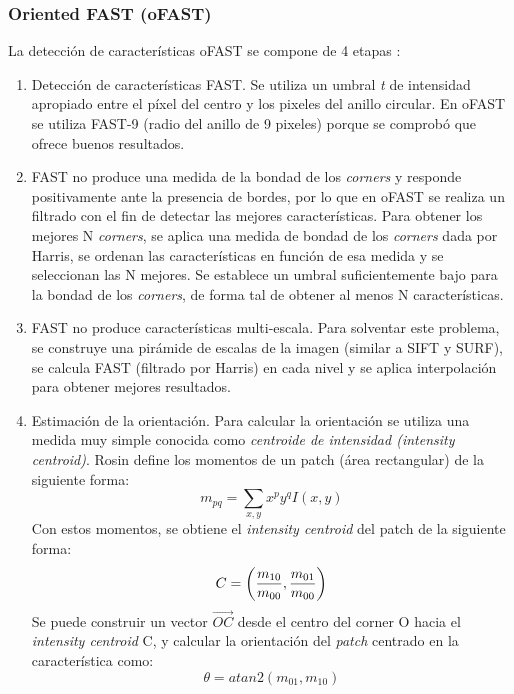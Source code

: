 \subsubsection{Oriented FAST (oFAST)}

La detección de características oFAST se compone de 4 etapas :
\begin{enumerate}

\item Detección de características FAST. Se utiliza un umbral \textsl{t} de intensidad apropiado entre el píxel del centro y los pixeles del anillo circular. En oFAST se utiliza FAST-9 (radio del anillo de 9 pixeles) porque se comprobó que ofrece buenos resultados.

\item FAST no produce una medida de la bondad de los \textit{corners} y responde positivamente ante la presencia de bordes, por lo que en oFAST se realiza un filtrado con el fin de detectar las mejores características. Para obtener los mejores N \textit{corners}, se aplica una medida de bondad de los \textit{corners} dada por Harris\cite{Harris88alvey}, se ordenan las características en función de esa medida y se seleccionan las N mejores. Se establece un umbral suficientemente bajo para la bondad de los \textit{corners}, de forma tal de obtener al menos N características.

\item FAST no produce características multi-escala. Para solventar este problema, se construye una pirámide de escalas de la imagen (similar a SIFT y SURF), se calcula FAST (filtrado por Harris) en cada nivel y se aplica interpolación para obtener mejores resultados.

\item Estimación de la orientación. Para calcular la orientación se utiliza una medida muy simple conocida como \textit{centroide de intensidad (intensity centroid)}. Rosin\cite{Rosin99measuringcorner} define los momentos de un patch (área rectangular) de la siguiente forma:
\begin{equation}
m_{pq} = \sum_{x,y} x^{p}y^{q}I(x,y)
\end{equation}
Con estos momentos, se obtiene el \textit{intensity centroid} del patch de la siguiente forma:
\begin{equation}
C = \left(
\frac{m_{10}}{m_{00}} , \frac{m_{01}}{m_{00}} \\
\right)
\end{equation}
Se puede construir un vector $\vec{OC}$ desde el centro del corner O hacia el \textit{intensity centroid} C, y calcular la orientación del \textit{patch} centrado en la característica como:
\begin{equation}
\theta = atan2(m_{01}, m_{10})
\end{equation}

\end{enumerate}

